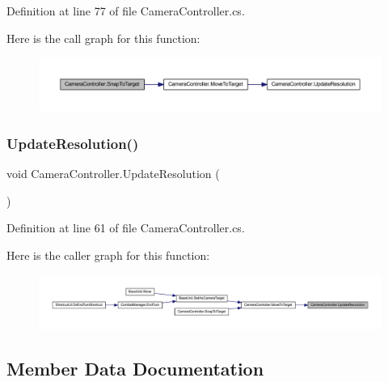 Definition at line 77 of file Camera\+Controller.\+cs.

Here is the call graph for this function\+:
\nopagebreak
\begin{figure}[H]
\begin{center}
\leavevmode
\includegraphics[width=350pt]{class_camera_controller_a9e2d7df7c696c1c2ce48384933c5d1ab_cgraph}
\end{center}
\end{figure}
\mbox{\label{class_camera_controller_a4894dc3111b871a8bf5ff422d30c1689}} 
\subsubsection{\texorpdfstring{UpdateResolution()}{UpdateResolution()}}
{\footnotesize\ttfamily void Camera\+Controller.\+Update\+Resolution (\begin{DoxyParamCaption}{ }\end{DoxyParamCaption})}



Definition at line 61 of file Camera\+Controller.\+cs.

Here is the caller graph for this function\+:
\nopagebreak
\begin{figure}[H]
\begin{center}
\leavevmode
\includegraphics[width=350pt]{class_camera_controller_a4894dc3111b871a8bf5ff422d30c1689_icgraph}
\end{center}
\end{figure}


\subsection{Member Data Documentation}
\mbox{\label{class_camera_controller_ac211a3ef97d78311cab3215e02dcaa8e}} 
